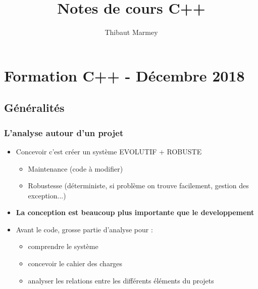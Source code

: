\documentclass[12pt,a4paper]{article}
\author{Thibaut Marmey}
\title{Notes de cours C++}
\begin{document}
	\maketitle

\begin{normalsize}
\tableofcontents
\end{normalsize}

\section{Formation C++ - Décembre 2018}
\subsection{Généralités}
\subsubsection{L'analyse autour d'un projet}
\begin{itemize}
\item Concevoir c'est créer un système EVOLUTIF + ROBUSTE
\begin{itemize}
\item Maintenance (code à modifier)
\item Robustesse (déterministe, si problème on trouve facilement, gestion des exception...)
\end{itemize}
\item \textbf{La conception est beaucoup plus importante que le developpement}
\item Avant le code, grosse partie d'analyse pour : 
\begin{itemize}
\item comprendre le système
\item concevoir le cahier des charges
\item analyser les relations entre les différents éléments du projets
\end{itemize}
\end{itemize}
\end{document}
